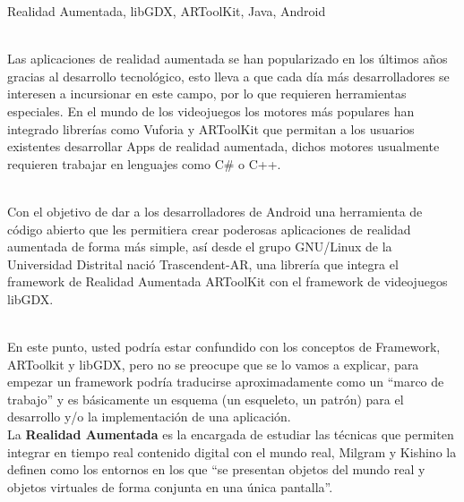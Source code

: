 \begin{multicols}{2}



 Realidad Aumentada, libGDX, ARToolKit, Java, Android



\\
Las aplicaciones de realidad aumentada se han popularizado en los últimos años gracias al desarrollo tecnológico, esto lleva a que cada día más desarrolladores se interesen a incursionar en este campo, por lo que requieren herramientas especiales. En el mundo de los videojuegos los motores más populares han integrado librerías como Vuforia y ARToolKit que permitan a los usuarios existentes desarrollar Apps de realidad aumentada, dichos motores usualmente requieren trabajar en lenguajes como C\# o C++. 

\\
Con el objetivo de dar a los desarrolladores de Android una herramienta de código abierto que les permitiera crear poderosas aplicaciones de realidad aumentada de forma más simple, así desde el grupo GNU/Linux de la Universidad Distrital nació Trascendent-AR, una librería que integra el framework de Realidad Aumentada ARToolKit con el framework de videojuegos libGDX.

\\
En este punto, usted podría estar confundido con los conceptos de Framework, ARToolkit y libGDX, pero no se preocupe que se lo vamos a explicar, para empezar un framework podría traducirse aproximadamente como un “marco de trabajo” y es básicamente un esquema (un esqueleto, un patrón) para el desarrollo y/o la implementación de una aplicación.
\\

La \textbf {Realidad Aumentada} es la encargada de estudiar las técnicas que permiten integrar en tiempo real contenido digital con el mundo real, Milgram y Kishino la definen como los entornos en los que “se presentan objetos del mundo real y objetos virtuales de forma conjunta en una única pantalla”. \cite{libroRA}


\end{multicols}
